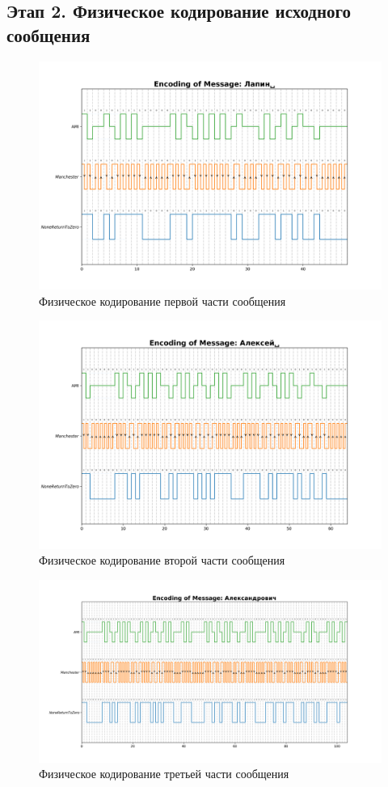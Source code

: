 \documentclass[12pt,onecolumn]{article}
\begin{document}
\subsection{Этап 2. Физическое кодирование исходного сообщения}
\begin{figure}[H]
    \centering
    \includegraphics[width=\textwidth]{image/encoding_1.png}
    \caption{Физическое кодирование первой части сообщения}
\end{figure}
\begin{figure}[H]
    \centering
    \includegraphics[width=\textwidth]{image/encoding_2.png}
    \caption{Физическое кодирование второй части сообщения}
\end{figure}
\begin{figure}[H]
    \centering
    \includegraphics[width=\textwidth]{image/encoding_3.png}
    \caption{Физическое кодирование третьей части сообщения}
\end{figure}
\end{document}
